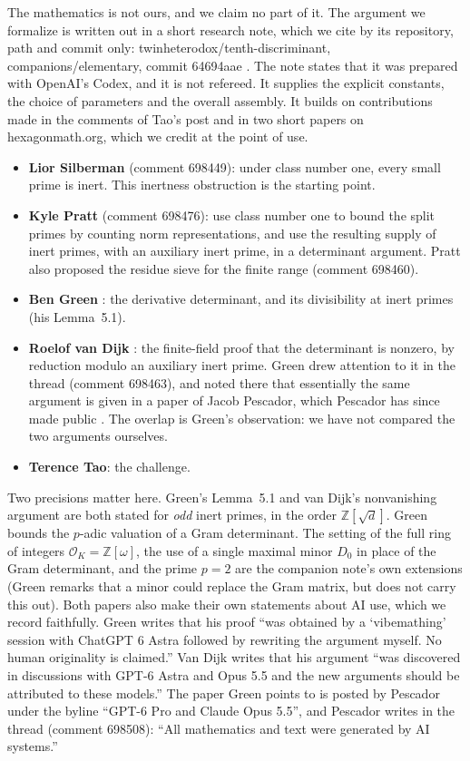 \documentclass[11pt]{article}
\theoremstyle{definition}
\newcommand{\Z}{\mathbb{Z}}
\newcommand{\OK}{\mathcal{O}_K}
\begin{document}
The mathematics is not ours, and we claim no part of it. The argument we formalize is written out in a short research note, which we cite by its repository, path and commit only: twinheterodox/tenth-discriminant, companions/elementary, commit 64694aae \cite{Companion}. The note states that it was prepared with OpenAI's Codex, and it is not refereed. It supplies the explicit constants, the choice of parameters and the overall assembly. It builds on contributions made in the comments of Tao's post \cite{Tao2026} and in two short papers on hexagonmath.org, which we credit at the point of use.
\begin{itemize}[nosep]
\item \textbf{Lior Silberman} (comment 698449): under class number one, every small prime is inert. This inertness obstruction is the starting point.
\item \textbf{Kyle Pratt} (comment 698476): use class number one to bound the split primes by counting norm representations, and use the resulting supply of inert primes, with an auxiliary inert prime, in a determinant argument. Pratt also proposed the residue sieve for the finite range (comment 698460).
\item \textbf{Ben Green} \cite{Green2026}: the derivative determinant, and its divisibility at inert primes (his Lemma~5.1).
\item \textbf{Roelof van Dijk} \cite{vanDijk2026v1}: the finite-field proof that the determinant is nonzero, by reduction modulo an auxiliary inert prime. Green drew attention to it in the thread (comment 698463), and noted there that essentially the same argument is given in a paper of Jacob Pescador, which Pescador has since made public \cite{Pescador2026}. The overlap is Green's observation: we have not compared the two arguments ourselves.
\item \textbf{Terence Tao}: the challenge.
\end{itemize}
Two precisions matter here. Green's Lemma~5.1 and van Dijk's nonvanishing argument are both stated for \emph{odd} inert primes, in the order $\Z[\sqrt d]$. Green bounds the $p$-adic valuation of a Gram determinant. The setting of the full ring of integers $\OK = \Z[\omega]$, the use of a single maximal minor $D_0$ in place of the Gram determinant, and the prime $p = 2$ are the companion note's own extensions (Green remarks that a minor could replace the Gram matrix, but does not carry this out). Both papers also make their own statements about AI use, which we record faithfully. Green writes that his proof ``was obtained by a `vibemathing' session with ChatGPT 6 Astra followed by rewriting the argument myself. No human originality is claimed.'' Van Dijk writes that his argument ``was discovered in discussions with GPT-6 Astra and Opus 5.5 and the new arguments should be attributed to these models.'' The paper Green points to is posted by Pescador under the byline ``GPT-6 Pro and Claude Opus 5.5'', and Pescador writes in the thread (comment 698508): ``All mathematics and text were generated by AI systems.''
\end{document}

